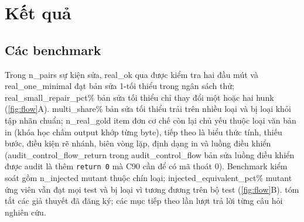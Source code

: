 \section{Kết quả}\label{sec:results}

\subsection{Các benchmark}
Trong {{n_pairs}} sự kiện sửa, {{real_ok}} qua được kiểm tra hai đầu mút và {{real_one_minimal}} đạt bản sửa 1-tối thiểu trong ngân sách thử; {{real_small_repair_pct}}\% bản sửa tối thiểu chỉ thay đổi một hoặc hai hunk (\cref{fig:flow}A). {{multi_share}}\% bản sửa tối thiểu trải trên nhiều loại và bị loại khỏi tập nhãn chuẩn; {{n_real_gold}} item đơn cơ chế còn lại chủ yếu thuộc loại văn bản in (khóa học chấm output khớp từng byte), tiếp theo là biểu thức tính, thiếu bước, điều kiện rẽ nhánh, biên vòng lặp, định dạng in và luồng điều khiển ({{audit_control_flow_return}} trong {{audit_control_flow}} bản sửa luồng điều khiển được audit là thêm \texttt{return 0} mà C90 cần để có mã thoát 0). Benchmark kiểm soát gồm {{n_injected}} mutant thuộc chín loại; {{injected_equivalent_pct}}\% mutant ứng viên vẫn đạt mọi test và bị loại vì tương đương trên bộ test (\cref{fig:flow}B).  tóm tắt các giả thuyết đã đăng ký; các mục tiếp theo lần lượt trả lời từng câu hỏi nghiên cứu.

\begin{table}[t]
\centering
\caption{Các giả thuyết đã đăng ký: chênh lệch trung bình trên các cohort, khoảng bootstrap 95\% và kết luận (H1a báo cáo chính trần trung bình theo kết quả test). H2 và H3 được báo cáo cho K-means và HAC.}\label{tab:hyp}
\small
{}
\end{table}

